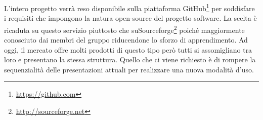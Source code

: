 L’intero progetto verrà reso disponibile sulla piattaforma GitHub\footnote{\url{https://github.com}}  per soddisfare i requisiti che impongono la natura open-source del progetto software.
La scelta è ricaduta su questo servizio piuttosto che suSourceforge\footnote{\url{http://sourceforge.net}} poiché maggiormente conosciuto dai membri del gruppo riducendone lo sforzo di apprendimento.
Ad oggi, il mercato offre molti prodotti di questo tipo però tutti si assomigliano tra loro e presentano la stessa struttura. Quello che ci viene richiesto è di rompere la sequenzialità delle presentazioni attuali per realizzare una nuova modalità d’uso.